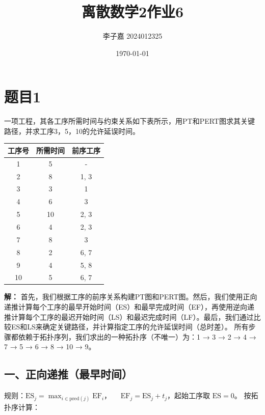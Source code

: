 \documentclass[utf8]{ctexart}
\title{\textbf{离散数学2\quad 作业6}}
\date{\today}
\author{李子嘉 2024012325}
\theoremstyle{mystyle}
\begin{document}
\maketitle

\section*{题目1}

\begin{problembox}
一项工程，其各工序所需时间与约束关系如下表所示，用PT和PERT图求其关键路径，并求工序3，5，10的允许延误时间。
\begin{center}
\begin{tabular}{|c|c|c|}
\hline
工序号 & 所需时间 & 前序工序 \\
\hline
1 & 5 & - \\
2 & 8 & 1, 3 \\
3 & 3 & 1 \\
4 & 6 & 3 \\
5 & 10 & 2, 3 \\
6 & 4 & 2, 3 \\
7 & 8 & 3 \\
8 & 2 & 6, 7 \\
9 & 4 & 5, 8 \\
10 & 5 & 6, 7 \\
\hline
\end{tabular}
\end{center}
\end{problembox}
\textbf{解：} 首先，我们根据工序的前序关系构建PT图和PERT图。然后，我们使用正向递推计算每个工序的最早开始时间（ES）和最早完成时间（EF），再使用逆向递推计算每个工序的最迟开始时间（LS）和最迟完成时间（LF）。最后，我们通过比较ES和LS来确定关键路径，并计算指定工序的允许延误时间（总时差）。
所有步骤都依赖于拓扑序列，我们求出的一种拓扑序（不唯一）为：1 → 3 → 2 → 4 → 7 → 5 → 6 → 8 → 10 → 9。
\subsection*{一、正向递推（最早时间）}
 
\noindent
规则：$\mathrm{ES}_j = \max_{i \in \mathrm{pred}(j)} \mathrm{EF}_i$，
$\quad\mathrm{EF}_j = \mathrm{ES}_j + t_j$，起始工序取 $\mathrm{ES}=0$。
按拓扑序计算：
 
\end{document}
